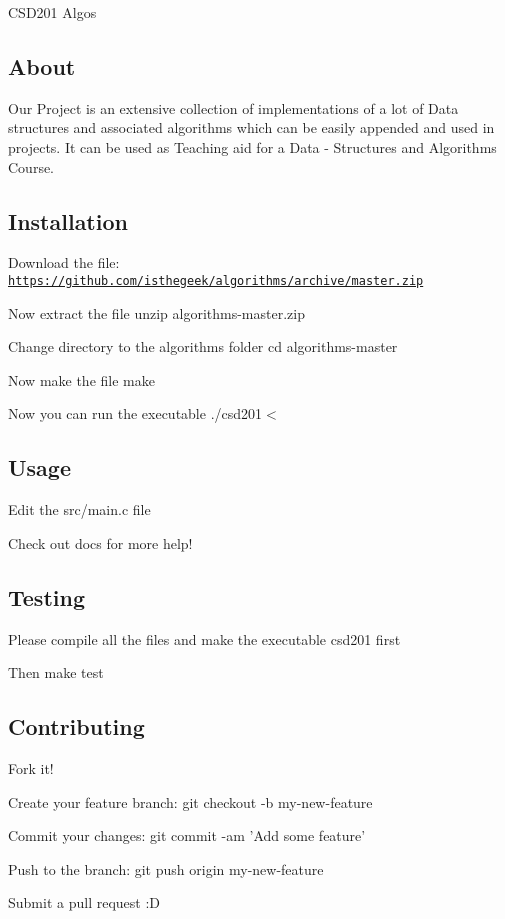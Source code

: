 C\-S\-D201 Algos

\subsection*{About}

Our Project is an extensive collection of implementations of a lot of Data structures and associated algorithms which can be easily appended and used in projects. It can be used as Teaching aid for a Data -\/ Structures and Algorithms Course.

\subsection*{Installation}

Download the file\-: \href{https://github.com/isthegeek/algorithms/archive/master.zip}{\tt https\-://github.\-com/isthegeek/algorithms/archive/master.\-zip}

Now extract the file {\ttfamily unzip algorithms-\/master.\-zip}

Change directory to the algorithms folder {\ttfamily cd algorithms-\/master}

Now make the file {\ttfamily make}

Now you can run the executable {\ttfamily ./csd201$<$}

\subsection*{Usage}

Edit the src/main.\-c file

Check out docs for more help!

\subsection*{Testing}

Please compile all the files and make the executable csd201 first

Then make test

\subsection*{Contributing}


\begin{DoxyEnumerate}
\item Fork it!
\item Create your feature branch\-: {\ttfamily git checkout -\/b my-\/new-\/feature}
\item Commit your changes\-: {\ttfamily git commit -\/am 'Add some feature'}
\item Push to the branch\-: {\ttfamily git push origin my-\/new-\/feature}
\item Submit a pull request \-:D
\end{DoxyEnumerate}

